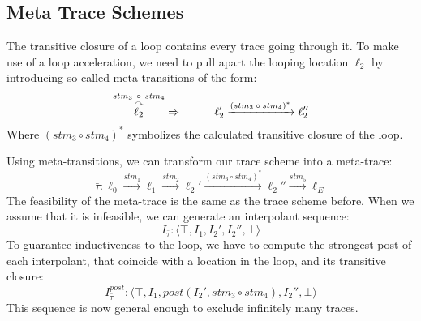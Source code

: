 \documentclass{article}
\begin{document}
\subsection{Meta Trace Schemes}
The transitive closure of a loop contains every trace going through it. To make use of a loop acceleration, we need to pull apart the looping location $\ell_2$ by introducing so called meta-transitions of the form:
\begin{equation*}
	\overset{stm_3\ \circ \ stm_4}{\overset{\curvearrowright}{\ell_2}} \Rightarrow \hspace*{1cm} \ell_2' \xrightarrow{\text{$(stm_3 \circ stm_4)^*$}} \ell_2''
\end{equation*}
Where $(stm_3 \circ stm_4)^*$ symbolizes the calculated transitive closure of the loop. \par
Using meta-transitions, we can transform our trace scheme into a meta-trace:
\begin{equation*}
	\bar{\tau}: \ell_0 \xrightarrow{\text{$stm_1$}} \ell_1 \xrightarrow{\text{$stm_2$}} \ell_2' \xrightarrow{\text{$(stm_3 \circ stm_4)^*$}} \ell_2'' \xrightarrow{\text{$stm_5$}} \ell_E
\end{equation*}
The feasibility of the meta-trace is the same as the trace scheme before. When we assume that it is infeasible, we can generate an interpolant sequence:
\begin{equation*}
I_{\bar{\tau}}: \langle \top, I_1, I_2', I_2'', \bot  \rangle
\end{equation*}
To guarantee inductiveness to the loop, we have to compute the strongest post of each interpolant, that coincide with a location in the loop, and its transitive closure:
\begin{equation*}
I_{\bar{\tau}}^{post}: \langle \top, I_1, post(I_2', stm_3 \circ stm_4), I_2'', \bot  \rangle
\end{equation*}
This sequence is now general enough to exclude infinitely many traces.
\end{document}
